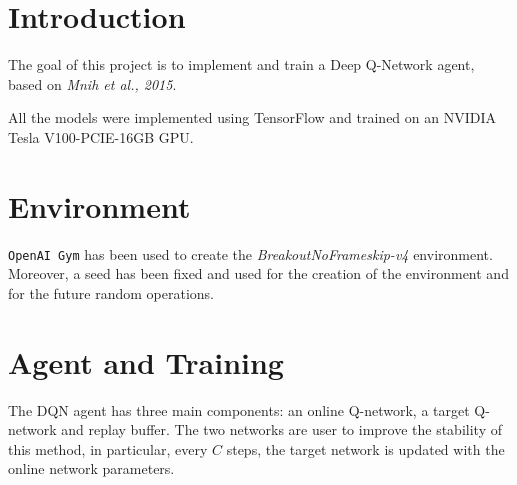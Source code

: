 \documentclass[a4paper,12pt]{article} %
\begin{document}
	\thispagestyle{empty}  
	\vspace{0.4cm}

	
	\section{Introduction}
	\label{section:intro}
	
	The goal of this project is to implement and train a Deep Q-Network agent, based on \textit{Mnih et al., 2015}.
	
	All the models were implemented using TensorFlow and trained on an NVIDIA Tesla V100-PCIE-16GB GPU.
	
	\section{Environment}
	\label{section:environment}
	
	
	\texttt{OpenAI Gym} has been used to create the \textit{BreakoutNoFrameskip-v4} environment. Moreover, a seed has been fixed and used for the creation of the environment and for the future random operations. 
	
	\section{Agent and Training}
	\label{section:agent}
	
	The DQN agent has three main components: an online Q-network, a target Q-network and replay buffer.
	The two networks are user to improve the stability of this method, in particular, every $C$ steps, the target network is updated with the online network parameters.
	
\end{document}
